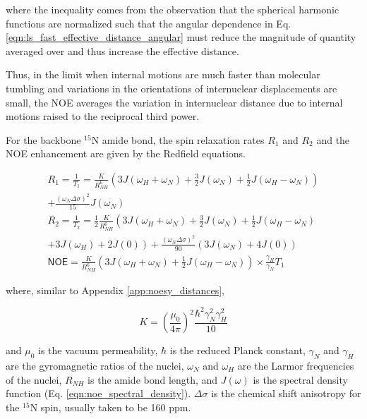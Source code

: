 \documentclass[9pt,review]{livecoms}
\begin{document}
\noindent where the inequality comes from the observation that the spherical harmonic functions are normalized such that the angular dependence in Eq. \ref{eqn:ls_fast_effective_distance_angular} must reduce the magnitude of quantity averaged over and thus increase the effective distance.

Thus, in the limit when internal motions are much faster than molecular tumbling and variations in the orientations of internuclear displacements are small, the NOE averages the variation in internuclear distance due to internal motions raised to the reciprocal third power.

\label{app:spin_relax_redfield}

For the backbone $^{15}$N amide bond, the spin relaxation rates $R_1$ and $R_2$ and the NOE enhancement are given by the Redfield equations.

\begin{equation}
\label{eqn:redfield}
\begin{gathered}
R_1 = \frac {1} {T_1} = \frac {K} {R_{NH}^6} \left( 3 J(\omega_H + \omega_N) + \frac {3} {2} J(\omega_N) + \frac {1} {2} J(\omega_H - \omega_N) \right) \\
+ \frac {\left( \omega_N \Delta \sigma \right)^2} {15} J(\omega_N) \\
R_2 = \frac {1} {T_2} = \frac {1} {2} \frac {K} {R_{NH}^6} \left( 3 J(\omega_H + \omega_N) + \frac {3} {2} J(\omega_N) + \frac {1} {2} J(\omega_H - \omega_N) \right. \\
\left. + 3 J(\omega_H) + 2 J(0) \right) + \frac {\left( \omega_N \Delta \sigma \right)^2} {90} \left( 3 J(\omega_N) + 4 J(0) \right) \\
\mathsf{NOE} = \frac {K} {R_{NH}^6} \left( 3 J(\omega_H + \omega_N) + \frac {1} {2} J(\omega_H - \omega_N) \right) \times \frac {\gamma_H} {\gamma_N} T_1
\end{gathered}
\end{equation}

\noindent where, similar to Appendix \ref{app:noesy_distances},

\begin{equation}
\label{eqn:spin_relaxation_constant}
K = \left( \frac {\mu_0} {4 \pi} \right)^2 \frac {\hbar^2 \gamma_N^2 \gamma_H^2} {10}
\end{equation}

\noindent and $\mu_0$ is the vacuum permeability, $\hbar$ is the reduced Planck constant, $\gamma_N$ and $\gamma_H$ are the gyromagnetic ratios of the nuclei, $\omega_N$ and $\omega_H$ are the Larmor frequencies of the nuclei, $R_{NH}$ is the amide bond length, and $J(\omega)$ is the spectral density function (Eq. \ref{eqn:noe_spectral_density}).
$\Delta \sigma$ is the chemical shift anisotropy for the $^{15}$N spin, usually taken to be 160 ppm.
\end{document}
